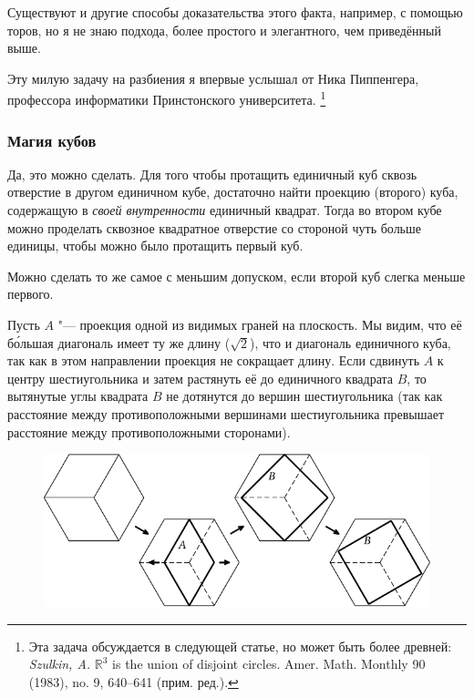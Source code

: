 \documentclass[twoside]{book}
\begin{document}
Существуют и другие способы доказательства этого факта, например, с помощью торов, но я не знаю подхода, более простого и элегантного, чем приведённый выше.

Эту милую задачу на разбиения я впервые услышал от Ника Пиппенгера, %
профессора информатики Принстонского университета.
\footnote{Эта задача обсуждается в следующей статье, но может быть более древней: 
\emph{Szulkin, A.} $\mathbb{R}^3$ is the union of disjoint circles. Amer. Math. Monthly 90 (1983), no. 9, 640--641 (прим. ред.).}

\subsubsection*{Магия кубов}%

Да, это можно сделать.
Для того чтобы протащить единичный куб сквозь отверстие в другом единичном кубе, достаточно найти проекцию (второго) куба, содержащую в \emph{своей внутренности} единичный квадрат.
Тогда во втором кубе можно проделать сквозное квадратное отверстие %
со стороной чуть больше единицы, чтобы можно было протащить первый куб.

Можно сделать то же самое с меньшим допуском, если второй куб слегка меньше первого.


Пусть $A$ "--- проекция одной из видимых граней на плоскость.
Мы видим, что её б\'{о}льшая диагональ имеет ту же длину ($\sqrt{2}$), что и диагональ единичного куба, так как в этом направлении проекция не сокращает длину.
Если сдвинуть  $A$ к центру шестиугольника и затем растянуть её до единичного квадрата $B$, то вытянутые углы квадрата $B$ не дотянутся до вершин шестиугольника (так как расстояние между противоположными вершинами шестиугольника превышает расстояние между противоположными сторонами).

\begin{figure}[!ht]
\centering
\includegraphics{mp/wink-11}
\end{figure}
\end{document}
